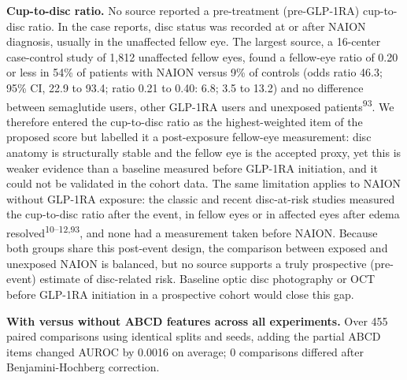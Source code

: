 \documentclass[
  11pt,
]{article}
\begin{document}
\textbf{Cup-to-disc ratio.} No source reported a pre-treatment
(pre-GLP-1RA) cup-to-disc ratio. In the case reports, disc status was
recorded at or after NAION diagnosis, usually in the unaffected fellow
eye. The largest source, a 16-center case-control study of 1,812
unaffected fellow eyes, found a fellow-eye ratio of 0.20 or less in 54\%
of patients with NAION versus 9\% of controls (odds ratio 46.3; 95\% CI,
22.9 to 93.4; ratio 0.21 to 0.40: 6.8; 3.5 to 13.2) and no difference
between semaglutide users, other GLP-1RA users and unexposed
patients\textsuperscript{93}. We therefore entered the cup-to-disc ratio
as the highest-weighted item of the proposed score but labelled it a
post-exposure fellow-eye measurement: disc anatomy is structurally
stable and the fellow eye is the accepted proxy, yet this is weaker
evidence than a baseline measured before GLP-1RA initiation, and it
could not be validated in the cohort data. The same limitation applies
to NAION without GLP-1RA exposure: the classic and recent disc-at-risk
studies measured the cup-to-disc ratio after the event, in fellow eyes
or in affected eyes after edema resolved\textsuperscript{10--12,93}, and
none had a measurement taken before NAION. Because both groups share
this post-event design, the comparison between exposed and unexposed
NAION is balanced, but no source supports a truly prospective
(pre-event) estimate of disc-related risk. Baseline optic disc
photography or OCT before GLP-1RA initiation in a prospective cohort
would close this gap.

\textbf{With versus without ABCD features across all experiments.} Over
455 paired comparisons using identical splits and seeds, adding the
partial ABCD items changed AUROC by 0.0016 on average; 0 comparisons
differed after Benjamini-Hochberg correction.
\end{document}
